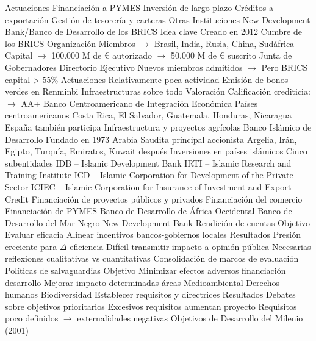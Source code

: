 \documentclass{nuevotema}
\begin{document}
\begin{esquemal}
			\3 Actuaciones
				\4 Financiación a PYMES
				\4 Inversión de largo plazo
				\4 Créditos a exportación
				\4 Gestión de tesorería y carteras
		\2 Otras Instituciones
			\3 New Development Bank/Banco de Desarrollo de los BRICS
				\4 Idea clave
				\4[] Creado en 2012
				\4[] Cumbre de los BRICS
				\4 Organización
				\4[] Miembros
				\4[] $\to$ Brasil, India, Rusia, China, Sudáfrica
				\4[] Capital
				\4[] $\to$ 100.000 M de € autorizado
				\4[] $\to$ 50.000 M de € suscrito
				\4[] Junta de Gobernadores
				\4[] Directorio Ejecutivo
				\4[] Nuevos miembros admitidos
				\4[] $\to$ Pero BRICS capital > 55\%
				\4 Actuaciones
				\4[] Relativamente poca actividad
				\4[] Emisión de bonos verdes en Renminbi
				\4[] Infraestructuras sobre todo
				\4 Valoración
				\4[] Calificación crediticia:
				\4[] $\to$ AA+
			\3 Banco Centroamericano de Integración Económica
				\4 Países centroamericanos
				\4 Costa Rica, El Salvador, Guatemala, Honduras, Nicaragua
				\4 España también participa
				\4 Infraestructura y proyectos agrícolas
			\3 Banco Islámico de Desarrollo
				\4 Fundado en 1973
				\4 Arabia Saudita principal accionista
				\4[] Argelia, Irán, Egipto, Turquía, Emiratos, Kuwait después
				\4 Inversiones en países islámicos
				\4 Cinco subentidades
				\4[] IDB -- Islamic Development Bank
				\4[] IRTI -- Islamic Research and Training Institute
				\4[] ICD -- Islamic Corporation for Development of the Private Sector
				\4[] ICIEC -- Islamic Corporation for Insurance of Investment and Export Credit
				\4 Financiación de proyectos públicos y privados
				\4 Financiación del comercio
				\4 Financiación de PYMES
			\3 Banco de Desarrollo de África Occidental
			\3 Banco de Desarrollo del Mar Negro
				\4 New Development Bank
	\1 
		\2 Rendición de cuentas
			\3 Objetivo
				\4 Evaluar eficacia
				\4 Alinear incentivos bancos-gobiernos locales
			\3 Resultados
				\4 Presión creciente para $\varDelta$ eficiencia
				\4 Difícil transmitir impacto a opinión pública
				\4 Necesarias reflexiones cualitativas vs cuantitativas
				\4 Consolidación de marcos de evaluación
		\2 Políticas de salvaguardias
			\3 Objetivo
				\4 Minimizar efectos adversos financiación desarrollo
				\4 Mejorar impacto determinadas áreas
				\4[] Medioambiental
				\4[] Derechos humanos
				\4[] Biodiversidad
				\4 Establecer requisitos y directrices
			\3 Resultados
				\4 Debates sobre objetivos prioritarios
				\4 Excesivos requisitos aumentan proyecto
				\4 Requisitos poco definidos $\to$ externalidades negativas
		\2 Objetivos de Desarrollo del Milenio (2001)

\end{esquemal}
\end{document}
